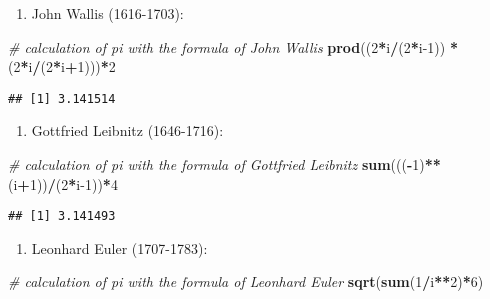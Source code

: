 \documentclass[
]{article}
\newenvironment{Shaded}{\begin{snugshade}}{\end{snugshade}}
\newcommand{\CommentTok}[1]{\textcolor[rgb]{0.56,0.35,0.01}{\textit{#1}}}
\newcommand{\DecValTok}[1]{\textcolor[rgb]{0.00,0.00,0.81}{#1}}
\newcommand{\KeywordTok}[1]{\textcolor[rgb]{0.13,0.29,0.53}{\textbf{#1}}}
\newcommand{\NormalTok}[1]{#1}
\newcommand{\OperatorTok}[1]{\textcolor[rgb]{0.81,0.36,0.00}{\textbf{#1}}}
\newcommand{\StringTok}[1]{\textcolor[rgb]{0.31,0.60,0.02}{#1}}
\providecommand{\tightlist}{%
  \setlength{\itemsep}{0pt}\setlength{\parskip}{0pt}}
\begin{document}
\begin{enumerate}
\def\labelenumi{\arabic{enumi}.}
\tightlist
\item
  John Wallis (1616-1703):
\end{enumerate}

\begin{Shaded}
\begin{Highlighting}[]
\CommentTok{# calculation of pi with the formula of John Wallis}
\KeywordTok{prod}\NormalTok{((}\DecValTok{2}\OperatorTok{*}\NormalTok{i}\OperatorTok{/}\NormalTok{(}\DecValTok{2}\OperatorTok{*}\NormalTok{i}\DecValTok{-1}\NormalTok{)) }\OperatorTok{*}\StringTok{ }\NormalTok{(}\DecValTok{2}\OperatorTok{*}\NormalTok{i}\OperatorTok{/}\NormalTok{(}\DecValTok{2}\OperatorTok{*}\NormalTok{i}\OperatorTok{+}\DecValTok{1}\NormalTok{)))}\OperatorTok{*}\DecValTok{2}
\end{Highlighting}
\end{Shaded}

\begin{verbatim}
## [1] 3.141514
\end{verbatim}

\begin{enumerate}
\def\labelenumi{\arabic{enumi}.}
\setcounter{enumi}{1}
\tightlist
\item
  Gottfried Leibnitz (1646-1716):
\end{enumerate}

\begin{Shaded}
\begin{Highlighting}[]
\CommentTok{# calculation of pi with the formula of Gottfried Leibnitz}
\KeywordTok{sum}\NormalTok{(((}\OperatorTok{-}\DecValTok{1}\NormalTok{)}\OperatorTok{**}\NormalTok{(i}\OperatorTok{+}\DecValTok{1}\NormalTok{))}\OperatorTok{/}\NormalTok{(}\DecValTok{2}\OperatorTok{*}\NormalTok{i}\DecValTok{-1}\NormalTok{))}\OperatorTok{*}\DecValTok{4}
\end{Highlighting}
\end{Shaded}

\begin{verbatim}
## [1] 3.141493
\end{verbatim}

\begin{enumerate}
\def\labelenumi{\arabic{enumi}.}
\setcounter{enumi}{2}
\tightlist
\item
  Leonhard Euler (1707-1783):
\end{enumerate}

\begin{Shaded}
\begin{Highlighting}[]
\CommentTok{# calculation of pi with the formula of Leonhard Euler}
\KeywordTok{sqrt}\NormalTok{(}\KeywordTok{sum}\NormalTok{(}\DecValTok{1}\OperatorTok{/}\NormalTok{i}\OperatorTok{**}\DecValTok{2}\NormalTok{)}\OperatorTok{*}\DecValTok{6}\NormalTok{)}
\end{Highlighting}
\end{Shaded}
\end{document}
